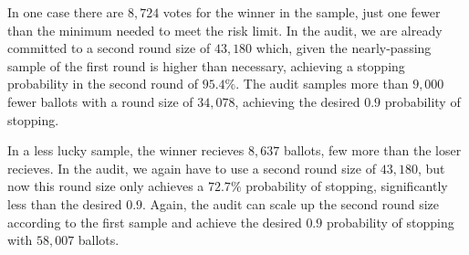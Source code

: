 In one case there are $8,724$ votes for the winner in the sample, just one fewer than the minimum needed to meet the risk limit. In the \Minerva audit, we are already committed to a second round size of $43,180$ which, given the nearly-passing sample of the first round is higher than necessary, achieving a stopping probability in the second round of $95.4\%$. The \Providence audit samples more than $9,000$ fewer ballots with a round size of $34,078$, achieving the desired $0.9$ probability of stopping.

In a less lucky sample, the winner recieves $8,637$ ballots, few more than the loser recieves. In the \Minerva audit, we again have to use a second round size of $43,180$, but now this round size only achieves a $72.7\%$ probability of stopping, significantly less than the desired $0.9$. Again, the \Providence audit can scale up the second round size according to the first sample and achieve the desired $0.9$ probability of stopping with $58,007$ ballots.







% 
% 

